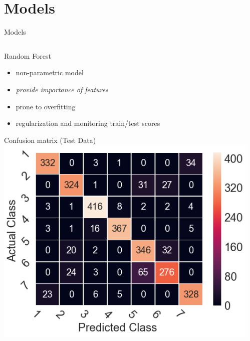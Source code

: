 \documentclass{if-beamer}
\begin{document}
\section{Models}
 
 
 
\begin{frame}{Models}
\begin{columns}

 \begin{column}{0.5\textwidth}
    \begin{block}{Random Forest}
        \begin{itemize}
         \item non-parametric model
          \item \emph{provide importance of features}
         \item prone to overfitting
           \item regularization and monitoring train/test scores
        \end{itemize}
   \end{block} 
   
    \begin{exampleblock}{Confusion matrix (Test Data)}
      \includegraphics[scale=0.2]{./figs/rf_cm_default_X34.png}
      \end{exampleblock}

 \end{column}
  
\begin{column}{0.5\textwidth}



\end{column}
\end{columns}
\end{frame}
\end{document}
